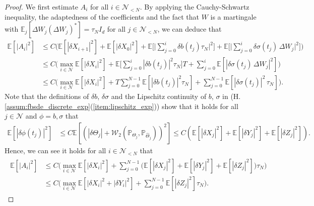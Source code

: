 \documentclass[11pt]{article}
\numberwithin{equation}{section}
\theoremstyle{definition}
\theoremstyle{remark}
\def\l{\label}  \def\f{\frac}  \def\fa{\forall}
\def\cN{\mathcal{N}}
\def\cW{\mathcal{W}}
\def\sE{{\mathbb{E}}}
\def\sP{\mathbb{P}}
\begin{document}
\begin{proof}
We first estimate $A_i$ for all $i\in \cN_{<N}$.
By applying the Cauchy-Schwartz inequality,
the adaptedness of the coefficients and
the fact that $W$ is a martingale with $\sE_j[\Delta W_j(\Delta W_j)^*]=\tau_N I_d$ 
for all $j\in \cN_{<N}$,
we can deduce that
\begin{align*}
\sE[|A_i|^2]
&\le
C\bigg(
\sE[|\delta {X}_{i+1}|^2]
+\sE[|\delta {X}_{0}|^2]
+\sE\bigg[ \bigg|
\sum_{j=0}^i
\delta b(t_{j})\tau_N
\bigg|^2\bigg]  
+
\sE\bigg[ \bigg|\sum_{j=0}^i
\delta \sigma (t_j)\, \Delta W_j
\bigg|^2\bigg]
\bigg)
\\
&\le 
C\bigg(
\max_{i\in\cN}\sE[|\delta {X}_{i}|^2]
+\sE\bigg[ 
\sum_{j=0}^i
|\delta b(t_{j})|^2\tau_N\bigg] 
T
+\sum_{j=0}^i\sE\left[ \left|
\delta \sigma (t_j)\, \Delta W_j
\right|^2\right]
\bigg)
\\
&\le 
C\bigg(
\max_{i\in\cN}\sE[|\delta {X}_{i}|^2]
+T\sum_{j=0}^{N-1}\sE[ 
|\delta b(t_{j})|^2\tau_N] 
+\sum_{j=0}^{N-1}\sE\left[ 
|\delta \sigma (t_j)|^2\, \tau_N
\right]
\bigg).
\end{align*}
Note that the definitions of $\delta b$, $\delta\sigma$ and 
the Lipschitz continuity of $b$, $\sigma$
in (H.\ref{assum:fbsde_discrete_exp}(\ref{item:lipschitz_exp})) show that
it holds for all $j\in \cN$
and $\phi=b,\sigma$  that
\begin{align*}
\sE[ |\delta \phi(t_j)|^2] 
&\le C\sE[ (|\delta \Theta_j|+\cW_2(\sP_{\Theta_j},\sP_{\hat{\Theta}_j}))^2] 
\le  C(\sE[ |\delta X_j|^2]+\sE[ |\delta Y_j|^2]+\sE[ |\delta Z_j|^2]).
\end{align*}
Hence,
we can see it holds for all $i\in \cN_{<N}$ 
 that
\begin{align}\l{eq:efficient_error2_bwd_imp}
\begin{split}
\sE[|A_i|^2]
&\le 
C\bigg(
\max_{i\in\cN}\sE[|\delta {X}_{i}|^2]
+\sum_{j=0}^{N-1}
\big( 
\sE[ |\delta X_j|^2]+\sE[ |\delta Y_j|^2]+\sE[ |\delta Z_j|^2]
\big) 
\tau_N
\bigg)
\\
&\le
C\bigg(
\max_{i\in\cN}\sE[|\delta {X}_{i}|^2+ |\delta Y_i|^2]
+
\sum_{j=0}^{N-1}\sE[ |\delta Z_j|^2]\tau_N
\bigg).
\end{split}
\end{align}




\end{proof}
\end{document}
